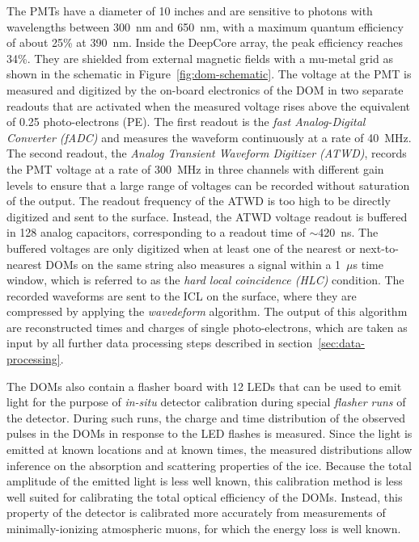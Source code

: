 The PMTs have a diameter of 10 inches and are sensitive to photons with wavelengths between 300~nm and 650~nm, with a maximum quantum efficiency of about 25\% at 390~nm. Inside the DeepCore array, the peak efficiency reaches 34\%. They are shielded from external magnetic fields with a mu-metal grid as shown in the schematic in Figure~\ref{fig:dom-schematic}. The voltage at the PMT is measured and digitized by the on-board electronics of the DOM in two separate readouts that are activated when the measured voltage rises above the equivalent of 0.25 photo-electrons (PE). The first readout is the \emph{fast Analog-Digital Converter (fADC)} and measures the waveform continuously at a rate of 40~MHz. The second readout, the \emph{Analog Transient Waveform Digitizer (ATWD)}, records the PMT voltage at a rate of 300~MHz in three channels with different gain levels to ensure that a large range of voltages can be recorded without saturation of the output. The readout frequency of the ATWD is too high to be directly digitized and sent to the surface. Instead, the ATWD voltage readout is buffered in 128 analog capacitors, corresponding to a readout time of $\sim$420~ns. The buffered voltages are only digitized when at least one of the nearest or next-to-nearest DOMs on the same string also measures a signal within a 1~$\mu$s time window, which is referred to as the \emph{hard local coincidence (HLC)} condition. The recorded waveforms are sent to the ICL on the surface, where they are compressed by applying the \emph{wavedeform} algorithm. The output of this algorithm are reconstructed times and charges of single photo-electrons, which are taken as input by all further data processing steps described in section~\ref{sec:data-processing}.

The DOMs also contain a flasher board with 12 LEDs that can be used to emit light for the purpose of \emph{in-situ} detector calibration during special \emph{flasher runs} of the detector. During such runs, the charge and time distribution of the observed pulses in the DOMs in response to the LED flashes is measured. Since the light is emitted at known locations and at known times, the measured distributions allow inference on the absorption and scattering properties of the ice. Because the total amplitude of the emitted light is less well known, this calibration method is less well suited for calibrating the total optical efficiency of the DOMs. Instead, this property of the detector is calibrated more accurately from measurements of minimally-ionizing atmospheric muons, for which the energy loss is well known.
